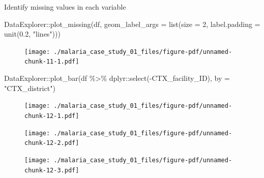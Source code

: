 \documentclass[
  letterpaper,
  DIV=11,
  numbers=noendperiod,
  oneside]{scrreprt}
\newenvironment{Shaded}{\begin{snugshade}}{\end{snugshade}}
\newcommand{\AttributeTok}[1]{\textcolor[rgb]{0.40,0.45,0.13}{#1}}
\newcommand{\DecValTok}[1]{\textcolor[rgb]{0.68,0.00,0.00}{#1}}
\newcommand{\FloatTok}[1]{\textcolor[rgb]{0.68,0.00,0.00}{#1}}
\newcommand{\FunctionTok}[1]{\textcolor[rgb]{0.28,0.35,0.67}{#1}}
\newcommand{\NormalTok}[1]{\textcolor[rgb]{0.00,0.23,0.31}{#1}}
\newcommand{\SpecialCharTok}[1]{\textcolor[rgb]{0.37,0.37,0.37}{#1}}
\newcommand{\StringTok}[1]{\textcolor[rgb]{0.13,0.47,0.30}{#1}}
\begin{document}
Identify missing values in each variable

\begin{Shaded}
\begin{Highlighting}[]
\NormalTok{DataExplorer}\SpecialCharTok{::}\FunctionTok{plot\_missing}\NormalTok{(df,}
                           \AttributeTok{geom\_label\_args =} \FunctionTok{list}\NormalTok{(}\AttributeTok{size =} \DecValTok{2}\NormalTok{, }\AttributeTok{label.padding =} \FunctionTok{unit}\NormalTok{(}\FloatTok{0.2}\NormalTok{, }\StringTok{"lines"}\NormalTok{)))}
\end{Highlighting}
\end{Shaded}

\begin{figure}[H]

{\centering \texttt{[image: ./malaria\_case\_study\_01\_files/figure-pdf/unnamed-chunk-11-1.pdf]}

}

\end{figure}

\begin{Shaded}
\begin{Highlighting}[]
\NormalTok{DataExplorer}\SpecialCharTok{::}\FunctionTok{plot\_bar}\NormalTok{(df }\SpecialCharTok{\%\textgreater{}\%} 
\NormalTok{                         dplyr}\SpecialCharTok{::}\FunctionTok{select}\NormalTok{(}\SpecialCharTok{{-}}\NormalTok{CTX\_facility\_ID),}
                       \AttributeTok{by =} \StringTok{"CTX\_district"}\NormalTok{)}
\end{Highlighting}
\end{Shaded}

\begin{figure}[H]

{\centering \texttt{[image: ./malaria\_case\_study\_01\_files/figure-pdf/unnamed-chunk-12-1.pdf]}

}

\end{figure}

\begin{figure}[H]

{\centering \texttt{[image: ./malaria\_case\_study\_01\_files/figure-pdf/unnamed-chunk-12-2.pdf]}

}

\end{figure}

\begin{figure}[H]

{\centering \texttt{[image: ./malaria\_case\_study\_01\_files/figure-pdf/unnamed-chunk-12-3.pdf]}

}

\end{figure}
\end{document}
